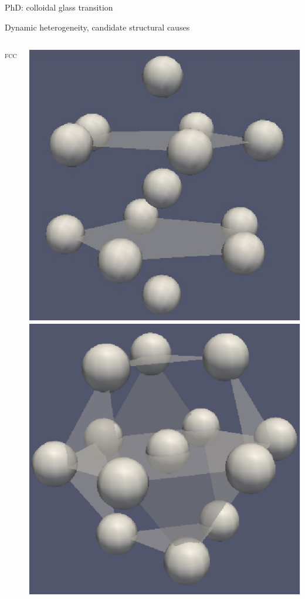 \begin{frame}{PhD: colloidal glass transition}
\begin{block}{Dynamic heterogeneity, candidate structural causes}
\begin{columns}
\begin{enumerate}
\setlength{\radius}{0.3\baselineskip}
\hfill \textsc{\footnotesize fcc}
\end{enumerate}
\includegraphics[width=\textwidth]{ico_13}\\
\includegraphics[width=\textwidth]{fcc_13}
\end{columns}
\end{block}


\end{frame}
